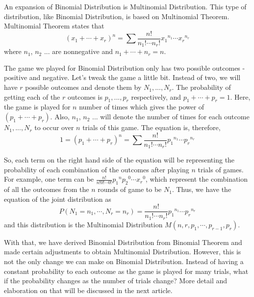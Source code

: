 \documentclass{article}
\theoremstyle{definition}
\begin{document}
\bigskip

\noindent An expansion of Binomial Distribution is Multinomial Distribution. This type of distribution, like Binomial Distribution, is based on Multinomial Theorem. Multinomial Theorem states that
\[
(x_1+ \cdots + x_r)^n = \sum \frac{n!}{n_1! \cdots n_r!}{x_1}^{n_1} \cdots {x_r}^{n_r}
\]
where $n_1$, $n_2$ ... are nonnegative and $n_1+ \cdots + n_r = n$.

\bigskip

\noindent The game we played for Binomial Distribution only has two possible outcomes - positive and negative. Let's tweak the game a little bit. Instead of two, we will have $r$ possible outcomes and denote them by $N_1, ..., N_r$. The probability of getting each of the $r$ outcomes is $p_1, ..., p_r$ respectively, and $p_1 + \cdots + p_r = 1$. Here, the game is played for $n$ number of times which gives the power of $(p_1+ \cdots + p_r)$. Also, $n_1$, $n_2$ ... will denote the number of times for each outcome $N_1, ..., N_r$ to occur over $n$ trials of this game. The equation is, therefore,
\[
1 = (p_1+ \cdots + p_r)^n = \sum \frac{n!}{n_1! \cdots n_r!}{p_1}^{n_1} \cdots {p_r}^{n_r}
\]

\bigskip

\noindent So, each term on the right hand side of the equation will be representing the probability of each combination of the outcomes after playing $n$ trials of games. For example, one term can be $\frac{n!}{n! 0! \cdots 0!}{p_1}^{n} {p_2}^{0} \cdots {x_r}^{0}$, which represent the combination of all the outcomes from the $n$ rounds of game to be $N_1$. Thus, we have the equation of the joint distribution as 
\[
P(N_1=n_1, \cdots ,N_r = n_r) = \frac{n!}{n_1! \cdots n_r!}{p_1}^{n_1} \cdots {p_r}^{n_r}
\]
and this distribution is the Multinomial Distribution $M(n,r,p_1,\cdots, p_{r-1},p_r)$. 

\bigskip

\noindent With that, we have derived Binomial Distribution from Binomial Theorem and made certain adjustments to obtain Multinomial Distribution. However, this is not the only change we can make on Binomial Distribution. Instead of having a constant probability to each outcome as the game is played for many trials, what if the probability changes as the number of trials change? More detail and elaboration on that will be discussed in the next article. 


%
%
%
%
%
\end{document}
